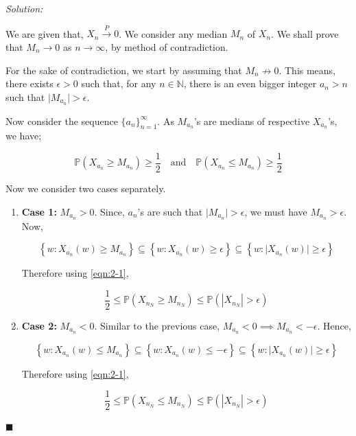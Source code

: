 \documentclass[12pt]{article}
\newcommand{\N}{\mathbb{N}}
\newcommand{\prob}{\mathbb{P}}
\theoremstyle{definition}
\newenvironment{answer}{\textit{Solution: }\quad }{ \hfill $\blacksquare$}
\numberwithin{equation}{section}
\begin{document}
\begin{answer}


We are given that, $X_n \xrightarrow{P} 0$. We consider any median $M_n$ of $X_n$. We shall prove that $M_n \rightarrow 0$ as $n \rightarrow \infty$, by method of contradiction.

For the sake of contradiction, we start by assuming that $M_n \not\rightarrow 0$. This means, there exists $\epsilon > 0$ such that, for any $n \in \N$, there is an even bigger integer $a_n > n$ such that $\vert M_{a_n} \vert > \epsilon$.

Now consider the sequence $\{a_n\}_{n = 1}^{\infty}$. As $M_{a_n}$'s are medians of respective $X_{a_n}$'s, we have;

\begin{equation}
    \prob\left( X_{a_n} \geq M_{a_n} \right)\geq \dfrac{1}{2}\quad \text{and}\quad \prob\left( X_{a_n} \leq M_{a_n} \right)\geq \dfrac{1}{2}
    \label{eqn:2-1}
\end{equation}

Now we consider two cases separately.

\begin{enumerate}
    \item \textbf{Case 1:} $M_{a_n} > 0$. Since, $a_n$'s are such that $\vert M_{a_n} \vert > \epsilon$, we must have $M_{a_n} > \epsilon$. Now, 
    
    $$\left\{ w: X_{a_n}(w) \geq M_{a_n} \right\} \subseteq \left\{ w: X_{a_n}(w) \geq \epsilon \right\} \subseteq \left\{ w: \vert X_{a_n}(w)\vert \geq \epsilon \right\}$$

    Therefore using \cref{eqn:2-1},

    \begin{equation}
        \dfrac{1}{2}\leq \prob\left( X_{n_N} \geq M_{n_N} \right) \leq \prob\left( |X_{n_N}|>\epsilon\right)
        \label{eqn:2-2}
    \end{equation}

    \item \textbf{Case 2:} $M_{a_n} < 0$. Similar to the previous case, $M_{a_n} < 0 \implies M_{a_n} < -\epsilon$. Hence,
    
    $$\left\{ w: X_{a_n}(w) \leq M_{a_n} \right\} \subseteq \left\{ w: X_{a_n}(w) \leq -\epsilon \right\} \subseteq \left\{ w: \vert X_{a_n}(w)\vert \geq \epsilon \right\}$$

    Therefore using \cref{eqn:2-1},

    \begin{equation}
        \dfrac{1}{2}\leq \prob\left( X_{n_N} \leq M_{n_N} \right) \leq \prob\left( |X_{n_N}|>\epsilon\right)
        \label{eqn:2-3}
    \end{equation}


\end{enumerate}
\end{answer}
\end{document}
